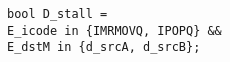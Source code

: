 \documentclass{article}
\begin{document}
\texttt{bool D\_stall = \\
\hspace*{17mm} E\_icode in \{IMRMOVQ, IPOPQ\} \&\& \\
\hspace*{17mm} E\_dstM in \{d\_srcA, d\_srcB\};
}
\end{document}

